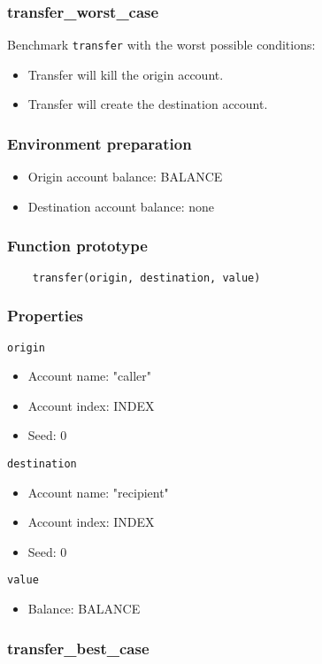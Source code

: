\documentclass[11pt,a4paper]{article}
\begin{document}
\subsubsection{transfer\_worst\_case}

Benchmark \verb|transfer| with the worst possible conditions:
\begin{itemize}
\item Transfer will kill the origin account.
\item Transfer will create the destination account.
\end{itemize}

\subsubsection*{Environment preparation}
\begin{itemize}
\item Origin account balance: BALANCE
\item Destination account balance: none
\end{itemize}

\subsubsection*{Function prototype}
\begin{verbatim}
    transfer(origin, destination, value)
\end{verbatim}

\subsubsection*{Properties}
\verb|origin|
\begin{itemize}
\item Account name: "caller"
\item Account index: INDEX
\item Seed: 0
\end{itemize}
\verb|destination|
\begin{itemize}
\item Account name: "recipient"
\item Account index: INDEX
\item Seed: 0
\end{itemize}
\verb|value|
\begin{itemize}
\item Balance: BALANCE
\end{itemize}

\subsubsection{transfer\_best\_case}
\end{document}
